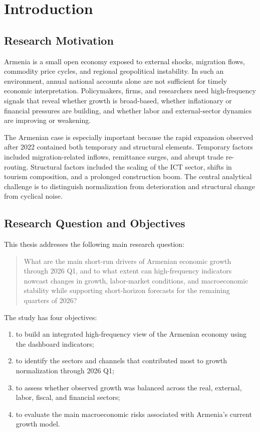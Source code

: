 \documentclass[12pt,a4paper]{report}
\begin{document}
\chapter{Introduction}
\section{Research Motivation}
Armenia is a small open economy exposed to external shocks, migration flows, commodity price cycles, and regional geopolitical instability. In such an environment, annual national accounts alone are not sufficient for timely economic interpretation. Policymakers, firms, and researchers need high-frequency signals that reveal whether growth is broad-based, whether inflationary or financial pressures are building, and whether labor and external-sector dynamics are improving or weakening.

The Armenian case is especially important because the rapid expansion observed after 2022 contained both temporary and structural elements. Temporary factors included migration-related inflows, remittance surges, and abrupt trade re-routing. Structural factors included the scaling of the ICT sector, shifts in tourism composition, and a prolonged construction boom. The central analytical challenge is to distinguish normalization from deterioration and structural change from cyclical noise.

\section{Research Question and Objectives}
This thesis addresses the following main research question:

\begin{quote}
What are the main short-run drivers of Armenian economic growth through 2026 Q1, and to what extent can high-frequency indicators nowcast changes in growth, labor-market conditions, and macroeconomic stability while supporting short-horizon forecasts for the remaining quarters of 2026?
\end{quote}

The study has four objectives:
\begin{enumerate}
    \item to build an integrated high-frequency view of the Armenian economy using the dashboard indicators;
    \item to identify the sectors and channels that contributed most to growth normalization through 2026 Q1;
    \item to assess whether observed growth was balanced across the real, external, labor, fiscal, and financial sectors;
    \item to evaluate the main macroeconomic risks associated with Armenia's current growth model.
\end{enumerate}
\end{document}

